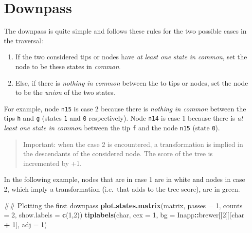 \documentclass[]{book}
\newenvironment{Shaded}{\begin{snugshade}}{\end{snugshade}}
\newcommand{\KeywordTok}[1]{\textcolor[rgb]{0.13,0.29,0.53}{\textbf{#1}}}
\newcommand{\DataTypeTok}[1]{\textcolor[rgb]{0.13,0.29,0.53}{#1}}
\newcommand{\DecValTok}[1]{\textcolor[rgb]{0.00,0.00,0.81}{#1}}
\newcommand{\StringTok}[1]{\textcolor[rgb]{0.31,0.60,0.02}{#1}}
\newcommand{\OperatorTok}[1]{\textcolor[rgb]{0.81,0.36,0.00}{\textbf{#1}}}
\newcommand{\NormalTok}[1]{#1}
\providecommand{\tightlist}{%
  \setlength{\itemsep}{0pt}\setlength{\parskip}{0pt}}
\theoremstyle{definition}
\theoremstyle{definition}
\theoremstyle{definition}
\theoremstyle{remark}
\begin{document}
\hypertarget{downpass}{%
\section{Downpass}\label{downpass}}

The downpass is quite simple and follows these rules for the two
possible cases in the traversal:

\begin{enumerate}
\def\labelenumi{\arabic{enumi}.}
\tightlist
\item
  If the two considered tips or nodes have \emph{at least one state in
  common}, set the node to be these states in \emph{common}.
\item
  Else, if there is \emph{nothing in common} between the to tips or
  nodes, set the node to be the \emph{union} of the two states.
\end{enumerate}

For example, node \texttt{n15} is case 2 because there is \emph{nothing
in common} between the tips \texttt{h} and \texttt{g} (states \texttt{1}
and \texttt{0} respectively). Node \texttt{n14} is case 1 because there
is \emph{at least one state in common} between the tip \texttt{f} and
the node \texttt{n15} (state \texttt{0}).

\begin{quote}
Important: when the case 2 is encountered, a transformation is implied
in the descendants of the considered node. The score of the tree is
incremented by +1.
\end{quote}

In the following example, nodes that are in case 1 are in white and
nodes in case 2, which imply a transformation (i.e.~that adds to the
tree score), are in green.

\begin{Shaded}
\begin{Highlighting}[]
\NormalTok{## Plotting the first downpass}
\KeywordTok{plot.states.matrix}\NormalTok{(matrix, }\DataTypeTok{passes =} \DecValTok{1}\NormalTok{, }\DataTypeTok{counts =} \DecValTok{2}\NormalTok{, }\DataTypeTok{show.labels =} \KeywordTok{c}\NormalTok{(}\DecValTok{1}\NormalTok{,}\DecValTok{2}\NormalTok{))}
\KeywordTok{tiplabels}\NormalTok{(char, }\DataTypeTok{cex =} \DecValTok{1}\NormalTok{, }\DataTypeTok{bg =}\NormalTok{ Inapp}\OperatorTok{::}\NormalTok{brewer[[}\DecValTok{2}\NormalTok{]][char }\OperatorTok{+}\StringTok{ }\DecValTok{1}\NormalTok{], }\DataTypeTok{adj =} \DecValTok{1}\NormalTok{)}
\end{Highlighting}
\end{Shaded}
\end{document}
